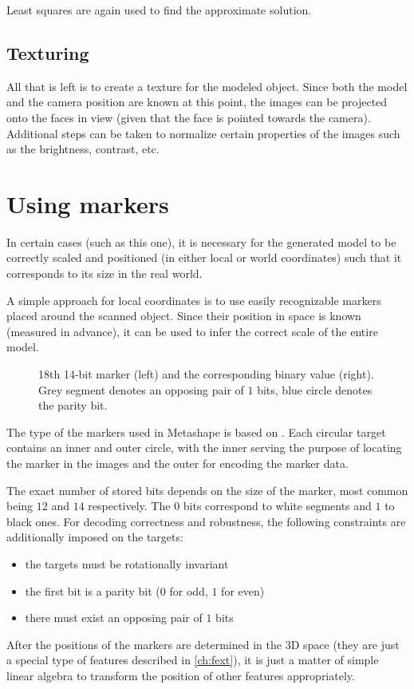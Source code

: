 Least squares are again used to find the approximate solution.

\subsection{Texturing}
All that is left is to create a texture for the modeled object.
Since both the model and the camera position are known at this point, the images can be projected onto the faces in view (given that the face is pointed towards the camera).
Additional steps can be taken to normalize certain properties of the images such as the brightness, contrast, etc.

\section{Using markers}
In certain cases (such as this one), it is necessary for the generated model to be correctly scaled and positioned (in either local or world coordinates) such that it corresponds to its size in the real world.

A simple approach for local coordinates is to use easily recognizable markers placed around the scanned object.
Since their position in space is known (measured in advance), it can be used to infer the correct scale of the entire model.

\begin{figure}[h]
	\centering
	
	\caption{18th 14-bit marker (left) and the corresponding binary value (right). Grey segment denotes an opposing pair of $1$ bits, blue circle denotes the parity bit.}
\end{figure}

The type of the markers used in Metashape is based on \citet{schneider19913,borisPatent}.
Each circular target contains an inner and outer circle, with the inner serving the purpose of locating the marker in the images and the outer for encoding the marker data.

The exact number of stored bits depends on the size of the marker, most common being $12$ and $14$ respectively.
The $0$ bits correspond to white segments and $1$ to black ones.
For decoding correctness and robustness, the following constraints are additionally imposed on the targets:

\begin{itemize}
	\item the targets must be rotationally invariant
	\item the first bit is a parity bit ($0$ for odd, $1$ for even)
	\item there must exist an opposing pair of $1$ bits
\end{itemize}

After the positions of the markers are determined in the 3D space (they are just a special type of features described in \ref{ch:fext}), it is just a matter of simple linear algebra to transform the position of other features appropriately.
